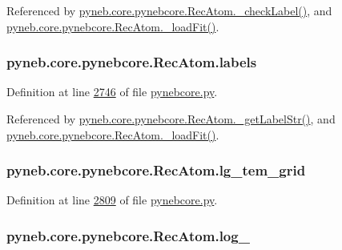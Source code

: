 Referenced by \hyperlink{pynebcore_8py_source_l02955}{pyneb.\-core.\-pynebcore.\-Rec\-Atom.\-\_\-check\-Label()}, and \hyperlink{pynebcore_8py_source_l02754}{pyneb.\-core.\-pynebcore.\-Rec\-Atom.\-\_\-load\-Fit()}.

\hypertarget{classpyneb_1_1core_1_1pynebcore_1_1_rec_atom_a0a758f4eb5a1b0780542eda87dcaeed3}{
\subsubsection[{labels}]{\setlength{\rightskip}{0pt plus 5cm}pyneb.\-core.\-pynebcore.\-Rec\-Atom.\-labels}}\label{classpyneb_1_1core_1_1pynebcore_1_1_rec_atom_a0a758f4eb5a1b0780542eda87dcaeed3}


Definition at line \hyperlink{pynebcore_8py_source_l02746}{2746} of file \hyperlink{pynebcore_8py_source}{pynebcore.\-py}.



Referenced by \hyperlink{pynebcore_8py_source_l02970}{pyneb.\-core.\-pynebcore.\-Rec\-Atom.\-\_\-get\-Label\-Str()}, and \hyperlink{pynebcore_8py_source_l02754}{pyneb.\-core.\-pynebcore.\-Rec\-Atom.\-\_\-load\-Fit()}.

\hypertarget{classpyneb_1_1core_1_1pynebcore_1_1_rec_atom_a6c6ed37093cbb2b2cf5a48df56357879}{
\subsubsection[{lg\-\_\-tem\-\_\-grid}]{\setlength{\rightskip}{0pt plus 5cm}pyneb.\-core.\-pynebcore.\-Rec\-Atom.\-lg\-\_\-tem\-\_\-grid}}\label{classpyneb_1_1core_1_1pynebcore_1_1_rec_atom_a6c6ed37093cbb2b2cf5a48df56357879}


Definition at line \hyperlink{pynebcore_8py_source_l02809}{2809} of file \hyperlink{pynebcore_8py_source}{pynebcore.\-py}.

\hypertarget{classpyneb_1_1core_1_1pynebcore_1_1_rec_atom_ad901cd583cbb6a4008bc41013e16d82f}{
\subsubsection[{log\-\_\-}]{\setlength{\rightskip}{0pt plus 5cm}pyneb.\-core.\-pynebcore.\-Rec\-Atom.\-log\-\_\-}}\label{classpyneb_1_1core_1_1pynebcore_1_1_rec_atom_ad901cd583cbb6a4008bc41013e16d82f}


